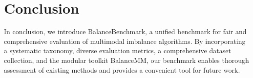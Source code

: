 
\section{Conclusion}
In conclusion, we introduce BalanceBenchmark, a unified benchmark for fair and comprehensive evaluation of multimodal imbalance algorithms. By incorporating a systematic taxonomy, diverse evaluation metrics, a comprehensive dataset collection, and the modular toolkit BalanceMM, our benchmark enables thorough assessment of existing methods and provides a convenient tool for future work. 